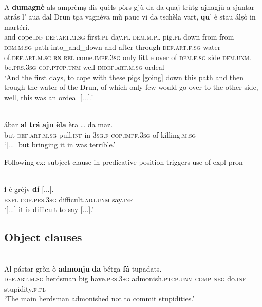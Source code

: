 \ea
\label{}
\\
\gll    A \textbf{dumagnè} als amprèmṣ dis quèls pòrs gjù da da quaj trùtg ajnagjù a sjantar atrás l’ aua dal Drun tga vagnéva mù pauc vi da tschèla vart, \textbf{qu}’ è stau álṣò in martéri.\\
and cope.\textsc{inf} \textsc{def.art.m.sg} first.\textsc{pl}  day.\textsc{pl} \textsc{dem.m.pl}  pig.\textsc{pl} down from from \textsc{dem.m.sg} path into\_and\_down and after through  \textsc{def.art.f.sg} water of.\textsc{def.art.m.sg}  \textsc{rn} \textsc{rel} come.\textsc{impf.3sg} only little over of \textsc{dem.f.sg} side \textsc{dem.unm.} be.\textsc{prs.3sg} \textsc{cop.ptcp.unm} well \textsc{indef.art.m.sg} ordeal \\
\glt `And the first days, to cope with these pigs [going] down this path and then trough the water of the Drun, of which only few would go over to the other side, well, this was an ordeal [...].'
\z

\ea
\label{}
\\
	\gll [...] ábar \textbf{al} \textbf{trá} \textbf{ajn} \textbf{èla} èra … da maz.   \\
{} but \textsc{def.art.m.sg} pull.\textsc{inf} in \textsc{3sg.f} \textsc{cop.impf.3sg} {} of killing.\textsc{m.sg}\\
\glt `[...] but bringing it in was terrible.'
\z

Following ex: subject clause in predicative position triggers use of expl pron

\ea
\label{}
\\
	\gll [...] \textbf{i} è gréjv \textbf{dí} [...].\\
 {} \textsc{expl} \textsc{cop.prs.3sg} difficult.\textsc{adj.unm} say.\textsc{inf}\\
\glt `[...] it is difficult to say [...].'
\z

\subsection{Object clauses}

\ea
\label{}
\\
\gll Al pástar gròn ò \textbf{admonju} \textbf{da} bétga \textbf{fá} tupadats.\\
\textsc{def.art.m.sg} herdsman big have.\textsc{prs.3sg} admonish.\textsc{ptcp.unm} \textsc{comp} \textsc{neg} do.\textsc{inf} stupidity.\textsc{f.pl}\\
\glt `The main herdsman admonished not to commit stupidities.'
\z

